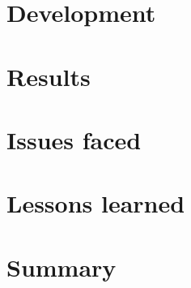 \documentclass[
pdftex,                %
a4paper,                 %
11pt,                     %
parskip=half,         %
headsepline,        %
]
{scrartcl}
\begin{document}
  

  \pagebreak

  \section{Development}

  

  \pagebreak

  \section{Results}

  

  \section{Issues faced}

  \section{Lessons learned}

  
	
	\section{Summary}
	
	
	
	\renewcommand{\refname}{Literatur}
	\begin{thebibliography}{xxxx}
		
	\end{thebibliography}
	
\end{document}
